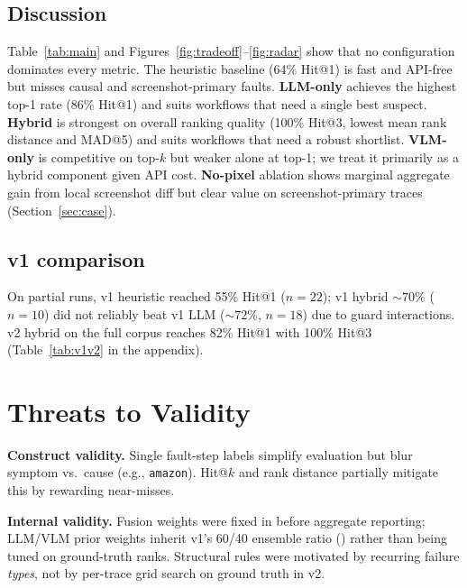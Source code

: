 \documentclass[sigconf,nonacm]{acmart}
\begin{document}
\subsection{Discussion}
\label{sec:discussion}

Table~\ref{tab:main} and Figures~\ref{fig:tradeoff}--\ref{fig:radar} show that no configuration dominates every metric.
The heuristic baseline (64\% Hit@1) is fast and API-free but misses causal and screenshot-primary faults.
\textbf{LLM-only} achieves the highest top-1 rate (86\% Hit@1) and suits workflows that need a single best suspect.
\textbf{Hybrid} is strongest on overall ranking quality (100\% Hit@3, lowest mean rank distance and MAD@5) and suits workflows that need a robust shortlist.
\textbf{VLM-only} is competitive on top-$k$ but weaker alone at top-1; we treat it primarily as a hybrid component given API cost.
\textbf{No-pixel} ablation shows marginal aggregate gain from local screenshot diff but clear value on screenshot-primary traces (Section~\ref{sec:case}).

\subsection{v1 comparison}

On partial runs, v1 heuristic reached 55\% Hit@1 ($n{=}22$); v1 hybrid ${\sim}70\%$ ($n{=}10$) did not reliably beat v1 LLM (${\sim}72\%$, $n{=}18$) due to guard interactions.
v2 hybrid on the full corpus reaches 82\% Hit@1 with 100\% Hit@3 (Table~\ref{tab:v1v2} in the appendix).

\section{Threats to Validity}
\label{sec:threats}

\textbf{Construct validity.}
Single fault-step labels simplify evaluation but blur symptom vs.\ cause (e.g., \texttt{amazon}).
Hit@$k$ and rank distance partially mitigate this by rewarding near-misses.

\textbf{Internal validity.}
Fusion weights were fixed in  before aggregate reporting; LLM/VLM prior weights inherit v1's 60/40 ensemble ratio () rather than being tuned on ground-truth ranks.
Structural rules were motivated by recurring failure \emph{types}, not by per-trace grid search on ground truth in v2.
\end{document}
